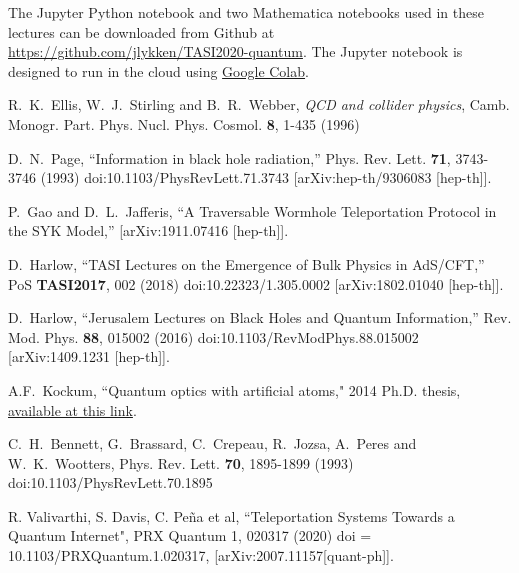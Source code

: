 \documentclass[a4paper,11pt]{article}
\begin{document}
%
\begin{thebibliography}{99}
 
 The Jupyter Python notebook and two Mathematica notebooks used in these lectures can be downloaded from Github
 at \href{https://github.com/jlykken/TASI2020-quantum}{https://github.com/jlykken/TASI2020-quantum}. The Jupyter
 notebook is designed to run in the cloud using \href{https://colab.research.google.com/notebooks/intro.ipynb}{Google Colab}.
 
R.~K.~Ellis, W.~J.~Stirling and B.~R.~Webber,
{\it QCD and collider physics},
Camb. Monogr. Part. Phys. Nucl. Phys. Cosmol. \textbf{8}, 1-435 (1996)

D.~N.~Page,
``Information in black hole radiation,''
Phys. Rev. Lett. \textbf{71}, 3743-3746 (1993)
doi:10.1103/PhysRevLett.71.3743
[arXiv:hep-th/9306083 [hep-th]].

P.~Gao and D.~L.~Jafferis,
``A Traversable Wormhole Teleportation Protocol in the SYK Model,''
[arXiv:1911.07416 [hep-th]].

D.~Harlow,
``TASI Lectures on the Emergence of Bulk Physics in AdS/CFT,''
PoS \textbf{TASI2017}, 002 (2018)
doi:10.22323/1.305.0002
[arXiv:1802.01040 [hep-th]].

D.~Harlow,
``Jerusalem Lectures on Black Holes and Quantum Information,''
Rev. Mod. Phys. \textbf{88}, 015002 (2016)
doi:10.1103/RevModPhys.88.015002
[arXiv:1409.1231 [hep-th]].

A.F.~Kockum,
``Quantum optics with artificial atoms,"
2014 Ph.D. thesis, 
\href{https://www.researchgate.net/publication/284259345_Quantum_optics_with_artificial_atoms}{available at this link}.

C.~H.~Bennett, G.~Brassard, C.~Crepeau, R.~Jozsa, A.~Peres and W.~K.~Wootters,
Phys. Rev. Lett. \textbf{70}, 1895-1899 (1993)
doi:10.1103/PhysRevLett.70.1895


 R. Valivarthi, S. Davis, C. Pe\~{n}a et al,
``Teleportation Systems Towards a Quantum Internet", PRX Quantum 1, 020317 (2020)
doi = {10.1103/PRXQuantum.1.020317},
[arXiv:2007.11157[quant-ph]].


\end{thebibliography}
\end{document}

